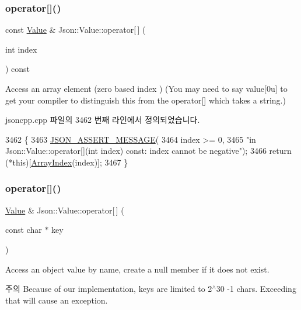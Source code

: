 \subsubsection{\texorpdfstring{operator[]()}{operator[]()}\hspace{0.1cm}{\footnotesize\ttfamily [4/9]}}
{\footnotesize\ttfamily const \hyperlink{class_json_1_1_value}{Value} \& Json\+::\+Value\+::operator\mbox{[}$\,$\mbox{]} (\begin{DoxyParamCaption}\item[{int}]{index }\end{DoxyParamCaption}) const}

Access an array element (zero based index ) (You may need to say \textquotesingle{}value\mbox{[}0u\mbox{]}\textquotesingle{} to get your compiler to distinguish this from the operator\mbox{[}\mbox{]} which takes a string.) 

jsoncpp.\+cpp 파일의 3462 번째 라인에서 정의되었습니다.


\begin{DoxyCode}
3462                                               \{
3463   \hyperlink{json_8h_ad7facdeeca0f495765e3b204c265eadb}{JSON\_ASSERT\_MESSAGE}(
3464       index >= 0,
3465       \textcolor{stringliteral}{"in Json::Value::operator[](int index) const: index cannot be negative"});
3466   \textcolor{keywordflow}{return} (*\textcolor{keyword}{this})[\hyperlink{class_json_1_1_value_a184a91566cccca7b819240f0d5561c7d}{ArrayIndex}(index)];
3467 \}
\end{DoxyCode}
\mbox{\label{class_json_1_1_value_acb912f4ec40a25ea6eb387730885f3d9}} 
\subsubsection{\texorpdfstring{operator[]()}{operator[]()}\hspace{0.1cm}{\footnotesize\ttfamily [5/9]}}
{\footnotesize\ttfamily \hyperlink{class_json_1_1_value}{Value} \& Json\+::\+Value\+::operator\mbox{[}$\,$\mbox{]} (\begin{DoxyParamCaption}\item[{const char $\ast$}]{key }\end{DoxyParamCaption})}

Access an object value by name, create a null member if it does not exist. \begin{DoxyNote}{주의}
Because of our implementation, keys are limited to 2$^\wedge$30 -\/1 chars. Exceeding that will cause an exception. 
\end{DoxyNote}


